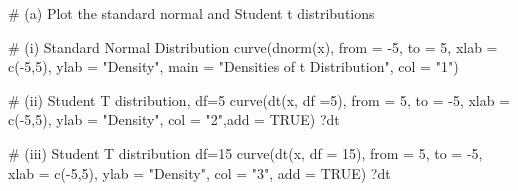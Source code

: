 \documentclass[
]{article}
\newenvironment{Shaded}{\begin{snugshade}}{\end{snugshade}}
\newcommand{\AttributeTok}[1]{\textcolor[rgb]{0.40,0.45,0.13}{#1}}
\newcommand{\CommentTok}[1]{\textcolor[rgb]{0.37,0.37,0.37}{#1}}
\newcommand{\ConstantTok}[1]{\textcolor[rgb]{0.56,0.35,0.01}{#1}}
\newcommand{\DecValTok}[1]{\textcolor[rgb]{0.68,0.00,0.00}{#1}}
\newcommand{\FunctionTok}[1]{\textcolor[rgb]{0.28,0.35,0.67}{#1}}
\newcommand{\NormalTok}[1]{\textcolor[rgb]{0.00,0.23,0.31}{#1}}
\newcommand{\SpecialCharTok}[1]{\textcolor[rgb]{0.37,0.37,0.37}{#1}}
\newcommand{\StringTok}[1]{\textcolor[rgb]{0.13,0.47,0.30}{#1}}
\begin{document}
\begin{tcolorbox}[enhanced jigsaw, arc=.35mm, bottomrule=.15mm, breakable, colback=white, colframe=quarto-callout-tip-color-frame, left=2mm, leftrule=.75mm, opacityback=0, rightrule=.15mm, toprule=.15mm]

\begin{Shaded}
\begin{Highlighting}[]
\CommentTok{\# (a) Plot the standard normal and Student t distributions}

\CommentTok{\# (i) Standard Normal Distribution}
\FunctionTok{curve}\NormalTok{(}\FunctionTok{dnorm}\NormalTok{(x), }\AttributeTok{from =} \SpecialCharTok{{-}}\DecValTok{5}\NormalTok{, }\AttributeTok{to =} \DecValTok{5}\NormalTok{,}
\AttributeTok{xlab =} \FunctionTok{c}\NormalTok{(}\SpecialCharTok{{-}}\DecValTok{5}\NormalTok{,}\DecValTok{5}\NormalTok{), }\AttributeTok{ylab =} \StringTok{"Density"}\NormalTok{,}
\AttributeTok{main =} \StringTok{"Densities of t Distribution"}\NormalTok{,}
\AttributeTok{col =} \StringTok{"1"}\NormalTok{)}

\CommentTok{\# (ii) Student T distribution, df=5}
\FunctionTok{curve}\NormalTok{(}\FunctionTok{dt}\NormalTok{(x, }\AttributeTok{df =}\DecValTok{5}\NormalTok{),}
            \AttributeTok{from =} \DecValTok{5}\NormalTok{, }\AttributeTok{to =} \SpecialCharTok{{-}}\DecValTok{5}\NormalTok{,}
            \AttributeTok{xlab =} \FunctionTok{c}\NormalTok{(}\SpecialCharTok{{-}}\DecValTok{5}\NormalTok{,}\DecValTok{5}\NormalTok{), }\AttributeTok{ylab =} \StringTok{"Density"}\NormalTok{,}
            \AttributeTok{col =} \StringTok{"2"}\NormalTok{,}\AttributeTok{add =} \ConstantTok{TRUE}\NormalTok{)}
\NormalTok{?dt}

\CommentTok{\# (iii) Student T distribution df=15}
\FunctionTok{curve}\NormalTok{(}\FunctionTok{dt}\NormalTok{(x, }\AttributeTok{df =} \DecValTok{15}\NormalTok{),}
            \AttributeTok{from =} \DecValTok{5}\NormalTok{, }\AttributeTok{to =} \SpecialCharTok{{-}}\DecValTok{5}\NormalTok{,}
            \AttributeTok{xlab =} \FunctionTok{c}\NormalTok{(}\SpecialCharTok{{-}}\DecValTok{5}\NormalTok{,}\DecValTok{5}\NormalTok{), }\AttributeTok{ylab =} \StringTok{"Density"}\NormalTok{,}
            \AttributeTok{col =} \StringTok{"3"}\NormalTok{, }\AttributeTok{add =} \ConstantTok{TRUE}\NormalTok{)}
\NormalTok{?dt}


\end{Highlighting}
\end{Shaded}
\end{tcolorbox}
\end{document}
